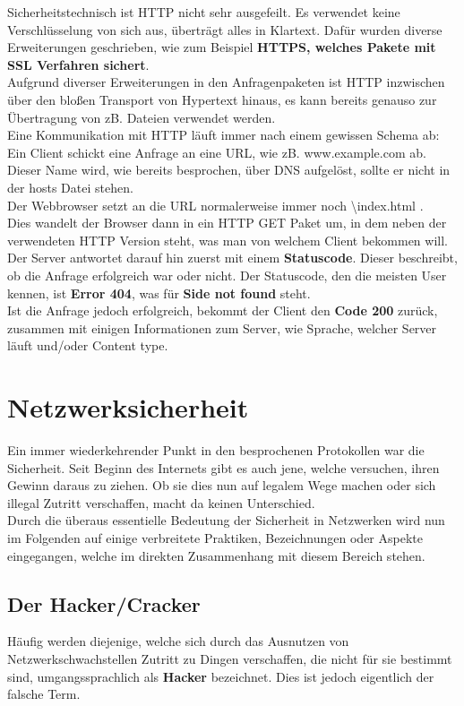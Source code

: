 \documentclass[12pt,a4paper]{report}
\begin{document}
\begin{onehalfspace}
Sicherheitstechnisch ist HTTP nicht sehr ausgefeilt. Es verwendet keine Verschlüsselung von sich aus, überträgt alles in Klartext. Dafür wurden diverse Erweiterungen geschrieben, wie zum Beispiel \textbf{HTTPS, welches Pakete mit SSL Verfahren sichert}.\\

Aufgrund diverser Erweiterungen in den Anfragenpaketen ist HTTP inzwischen über den bloßen Transport von Hypertext hinaus, es kann bereits genauso zur Übertragung von zB. Dateien verwendet werden.\\

Eine Kommunikation mit HTTP läuft immer nach einem gewissen Schema ab:\\
Ein Client schickt eine Anfrage an eine URL, wie zB. www.example.com ab. Dieser Name wird, wie bereits besprochen, über DNS aufgelöst, sollte er nicht in der hosts Datei stehen.\\
Der Webbrowser setzt an die URL normalerweise immer noch \glqq \textbackslash index.html \grqq .\\
Dies wandelt der Browser dann in ein HTTP GET Paket um, in dem neben der verwendeten HTTP Version steht, was man von welchem Client bekommen will.\\
Der Server antwortet darauf hin zuerst mit einem \textbf{Statuscode}. Dieser beschreibt, ob die Anfrage erfolgreich war oder nicht. Der Statuscode, den die meisten User kennen, ist \textbf{Error 404}, was für \textbf{Side not found} steht.\\
Ist die Anfrage jedoch erfolgreich, bekommt der Client den \textbf{Code 200} zurück, zusammen mit einigen Informationen zum Server, wie Sprache, welcher Server läuft und/oder Content type.
\section{Netzwerksicherheit}\label{sec:security}
Ein immer wiederkehrender Punkt in den besprochenen Protokollen war die Sicherheit. Seit Beginn des Internets gibt es auch jene, welche versuchen, ihren Gewinn daraus zu ziehen. Ob sie dies nun auf legalem Wege machen oder sich illegal Zutritt verschaffen, macht da keinen Unterschied.\\

Durch die überaus essentielle Bedeutung der Sicherheit in Netzwerken wird nun im Folgenden auf einige verbreitete Praktiken, Bezeichnungen oder Aspekte eingegangen, welche im direkten Zusammenhang mit diesem Bereich stehen.
\subsection{Der Hacker/Cracker}
Häufig werden diejenige, welche sich durch das Ausnutzen von Netzwerkschwachstellen Zutritt zu Dingen verschaffen, die nicht für sie bestimmt sind, umgangssprachlich als \textbf{Hacker} bezeichnet. Dies ist jedoch eigentlich der falsche Term.\\


\end{onehalfspace}
\end{document}
